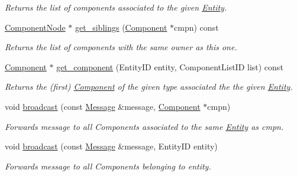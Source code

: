 \begin{DoxyCompactItemize}
\begin{DoxyCompactList}\small\item\em Returns the list of components associated to the given \hyperlink{classnta_1_1Entity}{Entity}. \end{DoxyCompactList}\item 
\mbox{\label{classnta_1_1ECS_a407bb99dd9dded2074fa9a32170e66f6}} 
\hyperlink{structnta_1_1utils_1_1LinkedNode}{Component\+Node} $\ast$ \hyperlink{classnta_1_1ECS_a407bb99dd9dded2074fa9a32170e66f6}{get\+\_\+siblings} (\hyperlink{classnta_1_1Component}{Component} $\ast$cmpn) const
\begin{DoxyCompactList}\small\item\em Returns the list of components with the same owner as this one. \end{DoxyCompactList}\item 
\mbox{\label{classnta_1_1ECS_a0a5e6e7ee700a11a048bfaec497f4df4}} 
\hyperlink{classnta_1_1Component}{Component} $\ast$ \hyperlink{classnta_1_1ECS_a0a5e6e7ee700a11a048bfaec497f4df4}{get\+\_\+component} (Entity\+ID entity, Component\+List\+ID list) const
\begin{DoxyCompactList}\small\item\em Returns the (first) \hyperlink{classnta_1_1Component}{Component} of the given type associated the the given \hyperlink{classnta_1_1Entity}{Entity}. \end{DoxyCompactList}\item 
\mbox{\label{classnta_1_1ECS_a997e9fa8509387cdb0f08680b019eb64}} 
void \hyperlink{classnta_1_1ECS_a997e9fa8509387cdb0f08680b019eb64}{broadcast} (const \hyperlink{structnta_1_1Message}{Message} \&message, \hyperlink{classnta_1_1Component}{Component} $\ast$cmpn)
\begin{DoxyCompactList}\small\item\em Forwards message to all Components associated to the same \hyperlink{classnta_1_1Entity}{Entity} as cmpn. \end{DoxyCompactList}\item 
\mbox{\label{classnta_1_1ECS_a3e2dc830c422d943cba4e44612b79c22}} 
void \hyperlink{classnta_1_1ECS_a3e2dc830c422d943cba4e44612b79c22}{broadcast} (const \hyperlink{structnta_1_1Message}{Message} \&message, Entity\+ID entity)
\begin{DoxyCompactList}\small\item\em Forwards message to all Components belonging to entity. \end{DoxyCompactList}\item 

\end{DoxyCompactItemize}
